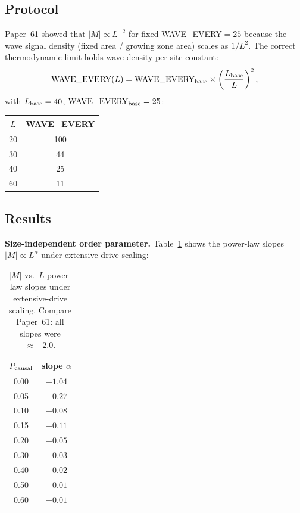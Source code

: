 \documentclass[12pt,a4paper]{article}
\begin{document}
\subsection{Protocol}

Paper~61 showed that $|M| \propto L^{-2}$ for fixed WAVE\_EVERY$=25$
because the wave signal density (fixed area / growing zone area) scales as $1/L^2$.
The correct thermodynamic limit holds wave density per site constant:
\begin{equation}
  \text{WAVE\_EVERY}(L) = \text{WAVE\_EVERY}_{\rm base}
  \times \left(\frac{L_{\rm base}}{L}\right)^2,
\end{equation}
with $L_{\rm base} = 40$, $\text{WAVE\_EVERY}_{\rm base} = 25$:
\begin{center}
\begin{tabular}{cc}
\toprule
$L$ & WAVE\_EVERY \\
\midrule
20 & 100 \\
30 & 44  \\
40 & 25  \\
60 & 11  \\
\bottomrule
\end{tabular}
\end{center}

\subsection{Results}

\textbf{Size-independent order parameter.}
Table~\ref{tab:slopes_A} shows the power-law slopes $|M| \propto L^\alpha$
under extensive-drive scaling:

\begin{table}[h]
\centering
\caption{$|M|$ vs.\ $L$ power-law slopes under extensive-drive scaling.
Compare Paper~61: all slopes were $\approx -2.0$.}
\label{tab:slopes_A}
\begin{tabular}{cc}
\toprule
$P_{\rm causal}$ & slope $\alpha$ \\
\midrule
0.00 & $-1.04$ \\
0.05 & $-0.27$ \\
0.10 & $+0.08$ \\
0.15 & $+0.11$ \\
0.20 & $+0.05$ \\
0.30 & $+0.03$ \\
0.40 & $+0.02$ \\
0.50 & $+0.01$ \\
0.60 & $+0.01$ \\
\bottomrule
\end{tabular}
\end{table}
\end{document}
